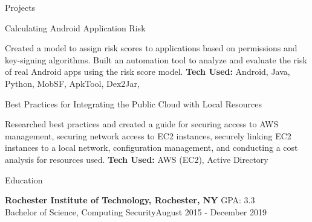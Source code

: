 \documentclass{resume}
\begin{document}
\begin{rSection}{Projects}

\begin{rSubsection}{Calculating Android Application Risk}{}{}{}
\item Created a model to assign risk scores to applications based on permissions and key-signing algorithms. Built an automation tool to analyze and evaluate the risk of real Android apps using the risk score model. 
{\bf Tech Used:} Android, Java, Python, MobSF, ApkTool, Dex2Jar, 
\end{rSubsection}

\begin{rSubsection}{Best Practices for Integrating the Public Cloud with Local Resources}{}{}{}
\item Researched best practices and created a guide for securing access to AWS management, securing network access to EC2 instances, securely linking EC2 instances to a local network, configuration management, and conducting a cost analysis for resources used.  
{\bf Tech Used:} AWS (EC2), Active Directory 
\end{rSubsection}

\end{rSection}


\begin{rSection}{Education}

{\bf Rochester Institute of Technology, Rochester, NY} \hfill { GPA: 3.3 }  
\\ Bachelor of Science, Computing Security\hfill {August 2015 - December 2019}

\end{rSection}


\end{document}
